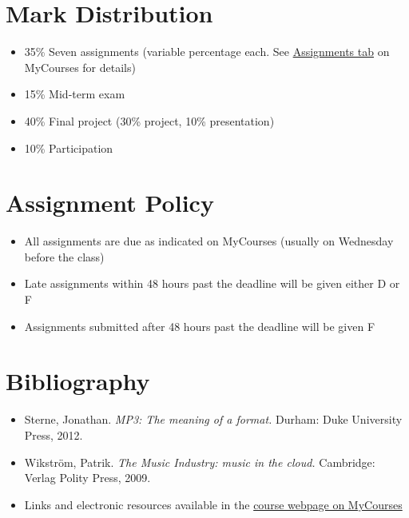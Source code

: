 \documentclass[11pt]{amsart}
\begin{document}
\section{Mark Distribution}
\begin{itemize}
\item 35\% Seven assignments (variable percentage each. See \href{https://mycourses2.mcgill.ca/d2l/lms/grades/my_grades/main.d2l?ou=230934}{Assignments tab} on MyCourses for details)
\item 15\% Mid-term exam
\item 40\% Final project (30\% project, 10\% presentation)
\item 10\% Participation
\end{itemize}

\section{Assignment Policy}
\begin{itemize}
\item All assignments are due as indicated on MyCourses (usually on Wednesday before the class)
\item Late assignments within 48 hours past the deadline will be given either D or F
\item Assignments submitted after 48 hours past the deadline will be given F
\end{itemize}

\section{Bibliography}
\begin{itemize}
\item Sterne, Jonathan. \emph{MP3: The meaning of a format.} Durham: Duke University Press, 2012.
\item Wikstr\"{o}m, Patrik. \emph{The Music Industry: music in the cloud.} Cambridge: Verlag Polity Press, 2009.
\item Links and electronic resources available in the \href{https://mycourses2.mcgill.ca/d2l/lms/links/view_links.d2l?ou=186686&d2l_stateScopes=%7B1%3A%5B%27gridpagenum%27,%27search%27,%27pagenum%27%5D,2%3A%5B%27lcs%27%5D,3%3A%5B%27grid%27,%27pagesize%27,%27htmleditor%27,%27hpg%27%5D%7D&d2l_stateGroups=%5B%27page%27%5D&d2l_statePageId=499&d2l_state_page=%7B%27Name%27%3A%27page%27,%27Controls%27%3A%5B%7B%27ControlId%27%3A%7B%27ID%27%3A%27slctlst_category%27%7D,%27StateType%27%3A%27%27,%27Key%27%3A%27%27,%27Name%27%3A%27category%27,%27State%27%3A%7B%27SelectedKey%27%3A%270%27,%27SelectedVal%27%3A%270%27%7D%7D%5D%7D&d2l_change=0#20825}{course webpage on MyCourses}

\end{itemize}
\end{document}
